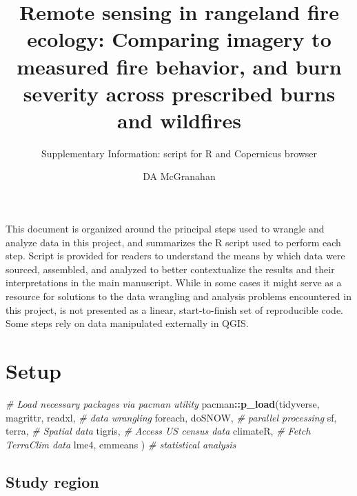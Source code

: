 \documentclass[
]{article}
\title{Remote sensing in rangeland fire ecology: Comparing imagery to
measured fire behavior, and burn severity across prescribed burns and
wildfires}
\subtitle{Supplementary Information: script for \textsf{R} and
Copernicus browser}
\author{DA McGranahan}
\date{}
\newenvironment{Shaded}{\begin{snugshade}}{\end{snugshade}}
\newcommand{\CommentTok}[1]{\textcolor[rgb]{0.56,0.35,0.01}{\textit{#1}}}
\newcommand{\FunctionTok}[1]{\textcolor[rgb]{0.13,0.29,0.53}{\textbf{#1}}}
\newcommand{\NormalTok}[1]{#1}
\newcommand{\SpecialCharTok}[1]{\textcolor[rgb]{0.81,0.36,0.00}{\textbf{#1}}}
\begin{document}
\maketitle

{
\setcounter{tocdepth}{2}
\tableofcontents
}
This document is organized around the principal steps used to wrangle
and analyze data in this project, and summarizes the \textsf{R} script
used to perform each step. Script is provided for readers to understand
the means by which data were sourced, assembled, and analyzed to better
contextualize the results and their interpretations in the main
manuscript. While in some cases it might serve as a resource for
solutions to the data wrangling and analysis problems encountered in
this project, is not presented as a linear, start-to-finish set of
reproducible code. Some steps rely on data manipulated externally in
QGIS.

\section{Setup}\label{setup}

\begin{Shaded}
\begin{Highlighting}[]
\CommentTok{\# Load necessary packages via pacman utility}
\NormalTok{  pacman}\SpecialCharTok{::}\FunctionTok{p\_load}\NormalTok{(tidyverse, magrittr, readxl, }\CommentTok{\# data wrangling}
\NormalTok{                 foreach, doSNOW,             }\CommentTok{\# parallel processing}
\NormalTok{                 sf, terra,                   }\CommentTok{\# Spatial data}
\NormalTok{                 tigris,                      }\CommentTok{\# Access US census data}
\NormalTok{                 climateR,                    }\CommentTok{\# Fetch TerraClim data}
\NormalTok{                 lme4, emmeans       )        }\CommentTok{\# statistical analysis}
\end{Highlighting}
\end{Shaded}

\subsection{Study region}\label{study-region}
\end{document}
